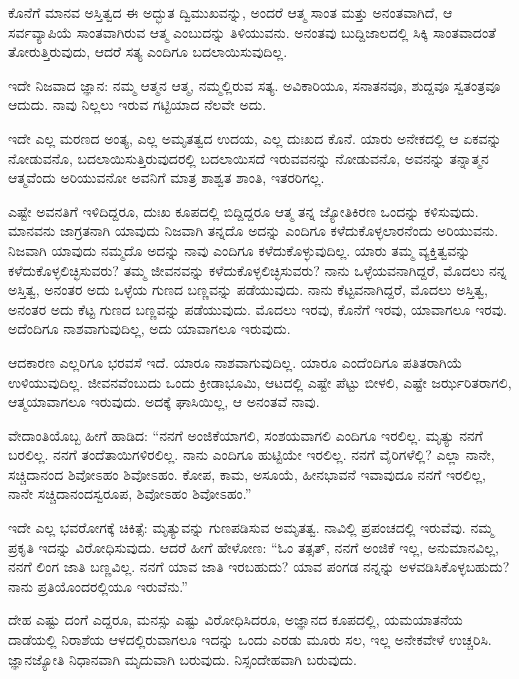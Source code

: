 ಕೊನೆಗೆ ಮಾನವ ಅಸ್ತಿತ್ವದ ಈ ಅದ್ಭುತ ದ್ವಿಮುಖವನ್ನು, ಅಂದರೆ ಆತ್ಮ ಸಾಂತ ಮತ್ತು ಅನಂತವಾಗಿದೆ, ಆ ಸರ್ವವ್ಯಾಪಿಯೆ ಸಾಂತವಾಗಿರುವ ಆತ್ಮ ಎಂಬುದನ್ನು ತಿಳಿಯುವನು. ಅನಂತವು ಬುದ್ದಿಜಾಲದಲ್ಲಿ ಸಿಕ್ಕಿ ಸಾಂತವಾದಂತೆ ತೋರುತ್ತಿರುವುದು, ಆದರೆ ಸತ್ಯ ಎಂದಿಗೂ ಬದಲಾಯಿಸುವುದಿಲ್ಲ.

ಇದೇ ನಿಜವಾದ ಜ್ಞಾನ: ನಮ್ಮ ಆತ್ಮನ ಆತ್ಮ, ನಮ್ಮಲ್ಲಿರುವ ಸತ್ಯ. ಅವಿಕಾರಿಯೂ, ಸನಾತನವೂ, ಶುದ್ದವೂ ಸ್ವತಂತ್ರವೂ ಆದುದು. ನಾವು ನಿಲ್ಲಲು ಇರುವ ಗಟ್ಟಿಯಾದ ನೆಲವೇ ಅದು.

ಇದೇ ಎಲ್ಲ ಮರಣದ ಅಂತ್ಯ, ಎಲ್ಲ ಅಮೃತತ್ವದ ಉದಯ, ಎಲ್ಲ ದುಃಖದ ಕೊನೆ. ಯಾರು ಅನೇಕದಲ್ಲಿ ಆ ಏಕವನ್ನು ನೋಡುವನೊ, ಬದಲಾಯಿಸುತ್ತಿರುವುದರಲ್ಲಿ ಬದಲಾಯಿಸದೆ ಇರುವವನನ್ನು ನೋಡುವನೊ, ಅವನನ್ನು ತನ್ನಾತ್ಮನ ಆತ್ಮವೆಂದು ಅರಿಯುವನೋ ಅವನಿಗೆ ಮಾತ್ರ ಶಾಶ್ವತ ಶಾಂತಿ, ಇತರರಿಗಲ್ಲ.

ಎಷ್ಟೇ ಅವನತಿಗೆ ಇಳಿದಿದ್ದರೂ, ದುಃಖ ಕೂಪದಲ್ಲಿ ಬಿದ್ದಿದ್ದರೂ ಆತ್ಮ ತನ್ನ ಜ್ಯೋತಿಕಿರಣ ಒಂದನ್ನು ಕಳಿಸುವುದು. ಮಾನವನು ಜಾಗ್ರತನಾಗಿ ಯಾವುದು ನಿಜವಾಗಿ ತನ್ನದೊ ಅದನ್ನು ಎಂದಿಗೂ ಕಳೆದುಕೊಳ್ಳಲಾರನೆಂದು ಅರಿಯುವನು. ನಿಜವಾಗಿ ಯಾವುದು ನಮ್ಮದೊ ಅದನ್ನು ನಾವು ಎಂದಿಗೂ ಕಳೆದುಕೊಳ್ಳುವುದಿಲ್ಲ. ಯಾರು ತಮ್ಮ ವ್ಯಕ್ತಿತ್ವವನ್ನು ಕಳೆದುಕೊಳ್ಳಲಿಚ್ಛಿಸುವರು? ತಮ್ಮ ಜೀವನವನ್ನು ಕಳೆದುಕೊಳ್ಳಲಿಚ್ಛಿಸುವರು? ನಾನು ಒಳ್ಳೆಯವನಾಗಿದ್ದರೆ, ಮೊದಲು ನನ್ನ ಅಸ್ತಿತ್ವ, ಅನಂತರ ಅದು ಒಳ್ಳೆಯ ಗುಣದ ಬಣ್ಣವನ್ನು ಪಡೆಯುವುದು. ನಾನು ಕೆಟ್ಟವನಾಗಿದ್ದರೆ, ಮೊದಲು ಅಸ್ತಿತ್ವ, ಅನಂತರ ಅದು ಕೆಟ್ಟ ಗುಣದ ಬಣ್ಣವನ್ನು ಪಡೆಯುವುದು. ಮೊದಲು ಇರವು, ಕೊನೆಗೆ ಇರವು, ಯಾವಾಗಲೂ ಇರವು. ಅದೆಂದಿಗೂ ನಾಶವಾಗುವುದಿಲ್ಲ, ಅದು ಯಾವಾಗಲೂ ಇರುವುದು.

ಆದಕಾರಣ ಎಲ್ಲರಿಗೂ ಭರವಸೆ ಇದೆ. ಯಾರೂ ನಾಶವಾಗುವುದಿಲ್ಲ. ಯಾರೂ ಎಂದೆಂದಿಗೂ ಪತಿತರಾಗಿಯೆ ಉಳಿಯುವುದಿಲ್ಲ. ಜೀವನವೆಂಬುದು ಒಂದು ಕ್ರೀಡಾಭೂಮಿ, ಆಟದಲ್ಲಿ ಎಷ್ಟೇ ಪೆಟ್ಟು ಬೀಳಲಿ, ಎಷ್ಟೇ ಜರ್ಝರಿತರಾಗಲಿ, ಆತ್ಮ\break ಯಾವಾಗಲೂ ಇರುವುದು. ಅದಕ್ಕೆ ಘಾಸಿಯಿಲ್ಲ, ಆ ಅನಂತವೆ ನಾವು.

ವೇದಾಂತಿಯೊಬ್ಬ ಹೀಗೆ ಹಾಡಿದ: “ನನಗೆ ಅಂಜಿಕೆಯಾಗಲಿ, ಸಂಶಯವಾಗಲಿ ಎಂದಿಗೂ ಇರಲಿಲ್ಲ. ಮೃತ್ಯು ನನಗೆ ಬರಲಿಲ್ಲ. ನನಗೆ ತಂದೆತಾಯಿಗಳಿರಲಿಲ್ಲ. ನಾನು ಎಂದಿಗೂ ಹುಟ್ಟಿಯೇ ಇರಲಿಲ್ಲ. ನನಗೆ ವೈರಿಗಳೆಲ್ಲಿ? ಎಲ್ಲಾ ನಾನೇ, ಸಚ್ಚಿದಾನಂದ ಶಿವೋಽಹಂ ಶಿವೋಽಹಂ. ಕೋಪ, ಕಾಮ, ಅಸೂಯೆ, ಹೀನಭಾವನೆ ಇವಾವುದೂ ನನಗೆ ಇರಲಿಲ್ಲ, ನಾನೇ ಸಚ್ಚಿದಾನಂದಸ್ವರೂಪ, ಶಿವೋಽಹಂ ಶಿವೋಽಹಂ.''

ಇದೇ ಎಲ್ಲ ಭವರೋಗಕ್ಕೆ ಚಿಕಿತ್ಸೆ: ಮೃತ್ಯುವನ್ನು ಗುಣಪಡಿಸುವ ಅಮೃತತ್ವ. ನಾವಿಲ್ಲಿ ಪ್ರಪಂಚದಲ್ಲಿ ಇರುವೆವು. ನಮ್ಮ ಪ್ರಕೃತಿ ಇದನ್ನು ವಿರೋಧಿಸುವುದು. ಆದರೆ ಹೀಗೆ ಹೇಳೋಣ: “ಓಂ ತತ್ಸತ್, ನನಗೆ ಅಂಜಿಕೆ ಇಲ್ಲ, ಅನುಮಾನವಿಲ್ಲ, ನನಗೆ ಲಿಂಗ ಜಾತಿ ಬಣ್ಣವಿಲ್ಲ. ನನಗೆ ಯಾವ ಜಾತಿ ಇರಬಹುದು? ಯಾವ ಪಂಗಡ ನನ್ನನ್ನು ಅಳವಡಿಸಿಕೊಳ್ಳಬಹುದು? ನಾನು ಪ್ರತಿಯೊಂದರಲ್ಲಿಯೂ ಇರುವೆನು.”

ದೇಹ ಎಷ್ಟು ದಂಗೆ ಎದ್ದರೂ, ಮನಸ್ಸು ಎಷ್ಟು ವಿರೋಧಿಸಿದರೂ, ಅಜ್ಞಾನದ ಕೂಪದಲ್ಲಿ, ಯಮಯಾತನೆಯ ದಾಡೆಯಲ್ಲಿ ನಿರಾಶೆಯ ಆಳದಲ್ಲಿರುವಾಗಲೂ ಇದನ್ನು ಒಂದು ಎರಡು ಮೂರು ಸಲ, ಇಲ್ಲ ಅನೇಕವೇಳೆ ಉಚ್ಚರಿಸಿ. ಜ್ಞಾನಜ್ಯೋತಿ ನಿಧಾನವಾಗಿ ಮೃದುವಾಗಿ ಬರುವುದು. ನಿಸ್ಸಂದೇಹವಾಗಿ ಬರುವುದು.


